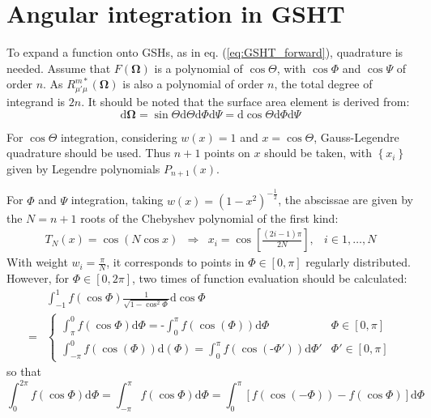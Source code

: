 \section{Angular integration in GSHT}

To expand a function onto GSHs, as in eq. (\ref{eq:GSHT_forward}),
quadrature is needed. Assume that $F(\mathbf{\Omega})$ is a polynomial
of $\cos\Theta$, with $\cos\Phi$ and $\cos\Psi$ of order $n$. As $R_{\mu'\mu}^{m*}(\mathbf{\Omega})$
is also a polynomial of order $n$, the total degree of integrand
is $2n$. It should be noted that the surface area element is derived from:
\begin{equation}
\mathrm{d}\mathbf{\Omega}=\sin\Theta\mathrm{d}\Theta\mathrm{d}\Phi\mathrm{d}\Psi=\mathrm{d}\cos\Theta\mathrm{d}\Phi\mathrm{d}\Psi
\end{equation}


For $\cos\Theta$ integration, considering $w(x)=1$ and $x=\cos\Theta$,
Gauss-Legendre quadrature should be used. Thus $n+1$ points on $x$
should be taken, with $\left\{ x_{i}\right\} $ given by Legendre
polynomials $P_{n+1}(x).$

For $\Phi$ and $\Psi$ integration, taking $w(x)=\left(1-x^{2}\right)^{-\frac{1}{2}}$,
the abscissae are given by the $N=n+1$ roots of the Chebyshev polynomial
of the first kind:
\begin{equation}
\begin{array}{cccc}
T_{N}(x)=\cos(N\cos x) & \Rightarrow & x_{i}=\cos\left[\frac{(2i-1)\pi}{2N}\right], & i\in1,\ldots,N\end{array}
\end{equation}
With weight $w_{i}=\frac{\pi}{N}$, it corresponds to points in $\Phi\in\left[0,\pi\right]$
regularly distributed. However, for $\Phi\in\left[0,2\pi\right]$,
two times of function evaluation should be calculated:
\begin{align}
 & \int_{-1}^{1}f(\cos\Phi)\frac{1}{\sqrt{1-\cos^{2}\Phi}}\mathrm{d}\cos\Phi\nonumber \\
= & \begin{cases}
\int_{\pi}^{0}f(\cos\Phi)\mathrm{d}\Phi=\text{-}\int_{0}^{\pi}f(\cos(\Phi))\mathrm{d}\Phi & \Phi\in[0,\pi]\\
\int_{-\pi}^{0}f(\cos(\Phi))\mathrm{d}(\Phi)=\int_{0}^{\pi}f(\cos(\text{-}\Phi'))\mathrm{d}\Phi' & \Phi'\in[0,\pi]
\end{cases}
\end{align}
so that
\begin{equation}
\int_{0}^{2\pi}f(\cos\Phi)\mathrm{d}\Phi=\int_{-\pi}^{\pi}f(\cos\Phi)\mathrm{d}\Phi=\int_{0}^{\pi}\left[f(\cos(-\Phi))-f(\cos\Phi)\right]\mathrm{d}\Phi
\end{equation}


